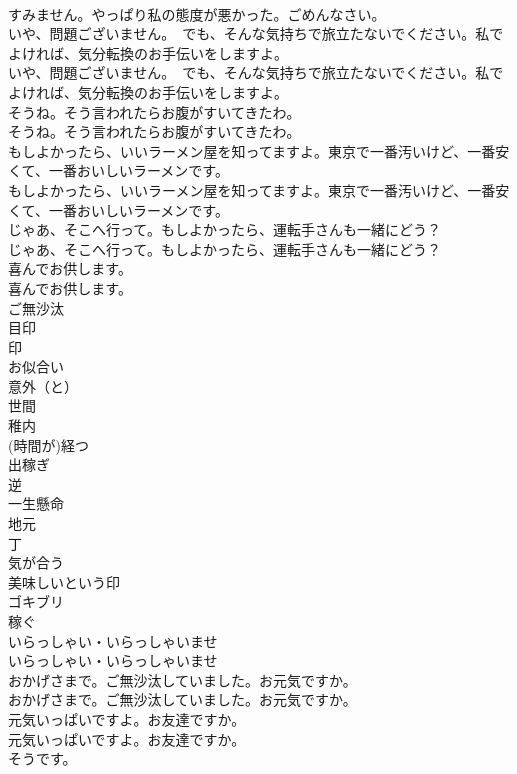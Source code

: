 \documentclass[8pt]{extreport}
\begin{document}
\begin{CJK}{UTF8}{min}
\\	すみません。やっぱり私の態度が悪かった。ごめんなさい。 
\\	いや、問題ございません。　でも、そんな気持ちで旅立たないでください。私でよければ、気分転換のお手伝いをしますよ。	
\\	いや、問題ございません。　でも、そんな気持ちで旅立たないでください。私でよければ、気分転換のお手伝いをしますよ。 
\\	そうね。そう言われたらお腹がすいてきたわ。	
\\	そうね。そう言われたらお腹がすいてきたわ。 
\\	もしよかったら、いいラーメン屋を知ってますよ。東京で一番汚いけど、一番安くて、一番おいしいラーメンです。	
\\	もしよかったら、いいラーメン屋を知ってますよ。東京で一番汚いけど、一番安くて、一番おいしいラーメンです。 
\\	じゃあ、そこへ行って。もしよかったら、運転手さんも一緒にどう？	
\\	じゃあ、そこへ行って。もしよかったら、運転手さんも一緒にどう？ 
\\	喜んでお供します。	
\\	喜んでお供します。 
\\	ご無沙汰
\\	目印
\\	印
\\	お似合い
\\	意外（と）
\\	世間
\\	稚内
\\	(時間が)経つ
\\	出稼ぎ
\\	逆
\\	一生懸命
\\	地元
\\	丁
\\	気が合う
\\	美味しいという印
\\	ゴキブリ
\\	稼ぐ
\\	いらっしゃい・いらっしゃいませ	
\\	いらっしゃい・いらっしゃいませ 
\\	おかげさまで。ご無沙汰していました。お元気ですか。	
\\	おかげさまで。ご無沙汰していました。お元気ですか。 
\\	元気いっぱいですよ。お友達ですか。	
\\	元気いっぱいですよ。お友達ですか。 
\\	そうです。	

\end{CJK}
\end{document}
